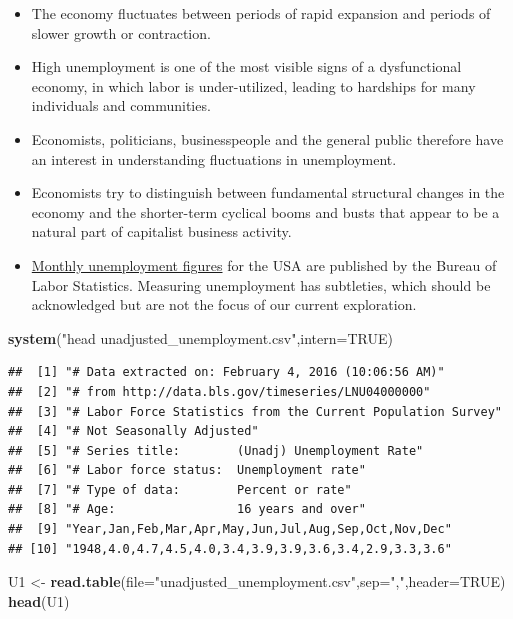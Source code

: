 \documentclass[]{article}
\newenvironment{Shaded}{\begin{snugshade}}{\end{snugshade}}
\newcommand{\KeywordTok}[1]{\textcolor[rgb]{0.13,0.29,0.53}{\textbf{#1}}}
\newcommand{\DataTypeTok}[1]{\textcolor[rgb]{0.13,0.29,0.53}{#1}}
\newcommand{\StringTok}[1]{\textcolor[rgb]{0.31,0.60,0.02}{#1}}
\newcommand{\OtherTok}[1]{\textcolor[rgb]{0.56,0.35,0.01}{#1}}
\newcommand{\NormalTok}[1]{#1}
\begin{document}
\begin{itemize}
\item
  The economy fluctuates between periods of rapid expansion and periods
  of slower growth or contraction.
\item
  High unemployment is one of the most visible signs of a dysfunctional
  economy, in which labor is under-utilized, leading to hardships for
  many individuals and communities.
\item
  Economists, politicians, businesspeople and the general public
  therefore have an interest in understanding fluctuations in
  unemployment.
\item
  Economists try to distinguish between fundamental structural changes
  in the economy and the shorter-term cyclical booms and busts that
  appear to be a natural part of capitalist business activity.
\item
  \href{http://data.bls.gov/timeseries/LNU04000000}{Monthly unemployment
  figures} for the USA are published by the Bureau of Labor Statistics.
  Measuring unemployment has subtleties, which should be acknowledged
  but are not the focus of our current exploration.
\end{itemize}

\begin{Shaded}
\begin{Highlighting}[]
\KeywordTok{system}\NormalTok{(}\StringTok{"head unadjusted_unemployment.csv"}\NormalTok{,}\DataTypeTok{intern=}\OtherTok{TRUE}\NormalTok{)}
\end{Highlighting}
\end{Shaded}

\begin{verbatim}
##  [1] "# Data extracted on: February 4, 2016 (10:06:56 AM)"        
##  [2] "# from http://data.bls.gov/timeseries/LNU04000000"          
##  [3] "# Labor Force Statistics from the Current Population Survey"
##  [4] "# Not Seasonally Adjusted"                                  
##  [5] "# Series title:        (Unadj) Unemployment Rate"           
##  [6] "# Labor force status:  Unemployment rate"                   
##  [7] "# Type of data:        Percent or rate"                     
##  [8] "# Age:                 16 years and over"                   
##  [9] "Year,Jan,Feb,Mar,Apr,May,Jun,Jul,Aug,Sep,Oct,Nov,Dec"       
## [10] "1948,4.0,4.7,4.5,4.0,3.4,3.9,3.9,3.6,3.4,2.9,3.3,3.6"
\end{verbatim}

\begin{Shaded}
\begin{Highlighting}[]
\NormalTok{U1 <-}\StringTok{ }\KeywordTok{read.table}\NormalTok{(}\DataTypeTok{file=}\StringTok{"unadjusted_unemployment.csv"}\NormalTok{,}\DataTypeTok{sep=}\StringTok{","}\NormalTok{,}\DataTypeTok{header=}\OtherTok{TRUE}\NormalTok{)}
\KeywordTok{head}\NormalTok{(U1)}
\end{Highlighting}
\end{Shaded}
\end{document}
